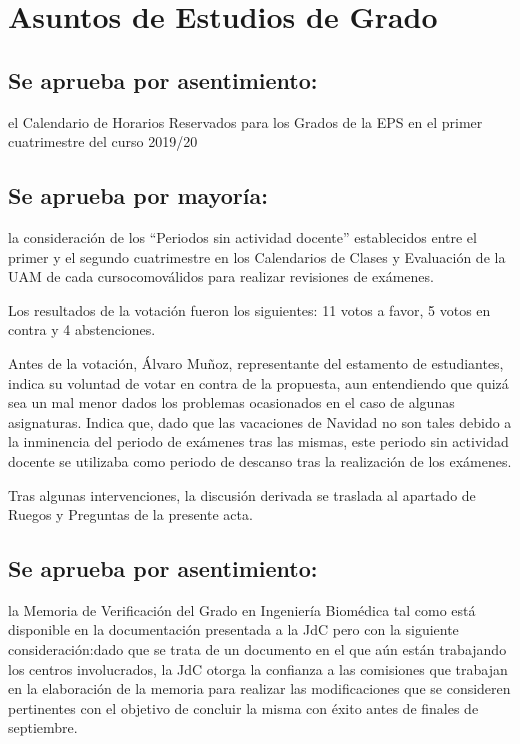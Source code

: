 \documentclass[numerado]{plantillasEPS} %
\begin{document}
\section{Asuntos de Estudios de Grado}
\subsection{Se aprueba por asentimiento:} el Calendario de Horarios Reservados para los Grados de la EPS en el primer cuatrimestre del curso 2019/20
\subsection{Se   aprueba   por   mayoría:} la  consideración  de  los  “Periodos  sin  actividad docente” establecidos entre el primer y el segundo cuatrimestre en los Calendarios de Clases y Evaluación de la UAM de cada cursocomoválidos para realizar revisiones de exámenes. 

Los resultados de la votación fueron los siguientes: 11 votos a favor, 5 votos en contra y 4 abstenciones. 

Antes  de  la  votación, Álvaro  Muñoz,  representante  del  estamento  de  estudiantes, indica su voluntad de votar en contra de la propuesta, aun entendiendo que quizá sea un  mal menor  dados  los  problemas  ocasionados  en  el  caso  de  algunas  asignaturas. Indica  que,  dado  que  las vacaciones  de Navidad  no  son tales  debido  a  la  inminencia del  periodo  de  exámenes  tras  las  mismas,  este  periodo  sin  actividad  docente  se utilizaba como periodo de descanso tras la realización de los exámenes. 

Tras algunas intervenciones, la discusión derivada se traslada al apartado de Ruegos y Preguntas de la presente acta. 

\subsection{Se   aprueba   por   asentimiento:}   la Memoria   de   Verificación   del   Grado   en Ingeniería  Biomédica tal  como  está  disponible  en  la  documentación  presentada  a  la JdC pero con la siguiente consideración:dado que se trata de un documento en el que aún  están  trabajando  los  centros  involucrados,  la  JdC  otorga  la  confianza  a  las comisiones   que   trabajan en   la   elaboración   de   la   memoria   para   realizar   las modificaciones  que  se  consideren  pertinentes  con  el  objetivo  de  concluir  la  misma con éxito antes de finales de septiembre. 
\end{document}
